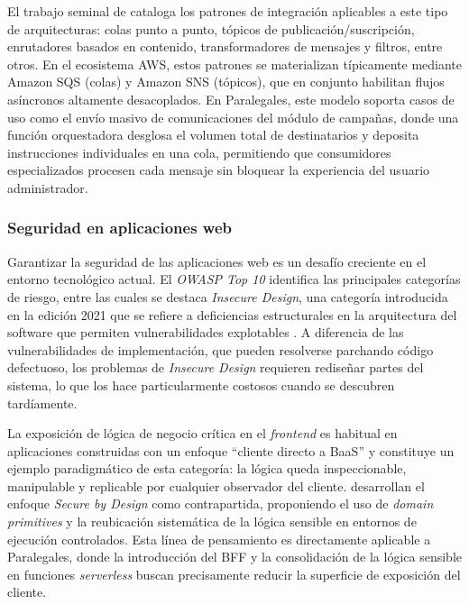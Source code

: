 El trabajo seminal de \textcite{Hohpe2003} cataloga los patrones de integración aplicables a este tipo de arquitecturas: colas punto a punto, tópicos de publicación/suscripción, enrutadores basados en contenido, transformadores de mensajes y filtros, entre otros. En el ecosistema AWS, estos patrones se materializan típicamente mediante Amazon SQS (colas) y Amazon SNS (tópicos), que en conjunto habilitan flujos asíncronos altamente desacoplados. En Paralegales, este modelo soporta casos de uso como el envío masivo de comunicaciones del módulo de campañas, donde una función orquestadora desglosa el volumen total de destinatarios y deposita instrucciones individuales en una cola, permitiendo que consumidores especializados procesen cada mensaje sin bloquear la experiencia del usuario administrador.

\subsubsection{Seguridad en aplicaciones web}

Garantizar la seguridad de las aplicaciones web es un desafío creciente en el entorno tecnológico actual. El \textit{OWASP Top 10} identifica las principales categorías de riesgo, entre las cuales se destaca \textit{Insecure Design}, una categoría introducida en la edición 2021 que se refiere a deficiencias estructurales en la arquitectura del software que permiten vulnerabilidades explotables \cite{OWASP2021}. A diferencia de las vulnerabilidades de implementación, que pueden resolverse parchando código defectuoso, los problemas de \textit{Insecure Design} requieren rediseñar partes del sistema, lo que los hace particularmente costosos cuando se descubren tardíamente.

La exposición de lógica de negocio crítica en el \textit{frontend} es habitual en aplicaciones construidas con un enfoque ``cliente directo a BaaS'' y constituye un ejemplo paradigmático de esta categoría: la lógica queda inspeccionable, manipulable y replicable por cualquier observador del cliente. \textcite{BirrEngwall2024} desarrollan el enfoque \textit{Secure by Design} como contrapartida, proponiendo el uso de \textit{domain primitives} y la reubicación sistemática de la lógica sensible en entornos de ejecución controlados. Esta línea de pensamiento es directamente aplicable a Paralegales, donde la introducción del BFF y la consolidación de la lógica sensible en funciones \textit{serverless} buscan precisamente reducir la superficie de exposición del cliente.


